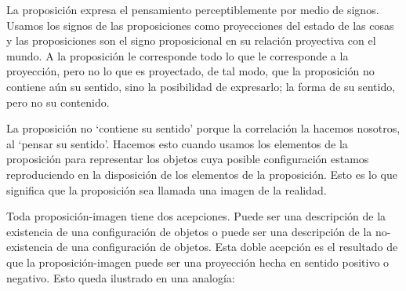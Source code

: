     La proposición expresa el pensamiento perceptiblemente por medio de signos.
    Usamos los signos de las proposiciones como proyecciones del estado de las cosas
    y las proposiciones son el signo proposicional en su relación proyectiva con el
    mundo. A la proposición le corresponde todo lo que le corresponde a la
    proyección, pero no lo que es proyectado, de tal modo, que la proposición no
    contiene aún su sentido, sino la posibilidad de expresarlo; la forma de su
    sentido, pero no su contenido.\autocite[cf.~][3.1,3.11-3.13]{wittgenstein1922tractatus}

    La proposición no `contiene su sentido' porque la correlación la hacemos nosotros,
    al `pensar su sentido'. Hacemos esto cuando usamos los elementos de la
    proposición para representar los objetos cuya posible configuración estamos
    reproduciendo en la disposición de los elementos de la proposición. Esto es lo
    que significa que la proposición sea llamada una imagen de la
    realidad.\autocite[cf.~][p.69]{anscombe1959iwt}

    Toda proposición-imagen tiene dos acepciones. Puede ser una descripción de
    la existencia de una configuración de objetos o puede ser una descripción de la
    no-existencia de una configuración de objetos.\autocite[cf.~][p.~72]{anscombe1959iwt}
    Esta doble acepción es el resultado de que la proposición-imagen puede ser una
    proyección hecha en sentido positivo o negativo.\autocite[cf.~][p.~74]{anscombe1959iwt} Esto
    queda ilustrado en una analogía:


